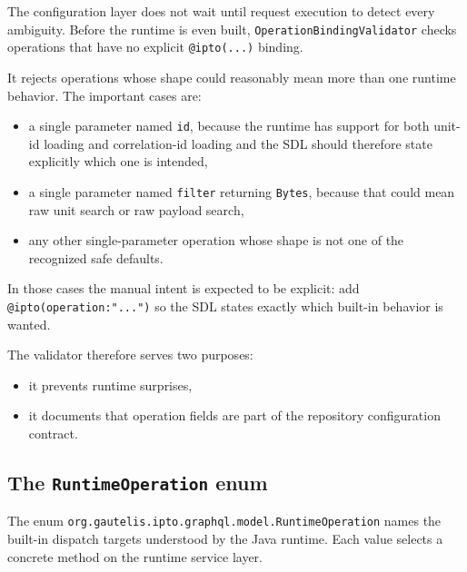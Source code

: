 The configuration layer does not wait until request execution to detect every ambiguity. Before the runtime is even built, \texttt{OperationBindingValidator} checks operations that have no explicit \texttt{@ipto(...)} binding.

It rejects operations whose shape could reasonably mean more than one runtime behavior. The important cases are:
\begin{itemize}
\item a single parameter named \texttt{id}, because the runtime has support for both unit-id loading and correlation-id loading and the SDL should therefore state explicitly which one is intended,
\item a single parameter named \texttt{filter} returning \texttt{Bytes}, because that could mean raw unit search or raw payload search,
\item any other single-parameter operation whose shape is not one of the recognized safe defaults.
\end{itemize}

In those cases the manual intent is expected to be explicit: add \texttt{@ipto(operation:"...")} so the SDL states exactly which built-in behavior is wanted.

The validator therefore serves two purposes:
\begin{itemize}
\item it prevents runtime surprises,
\item it documents that operation fields are part of the repository configuration contract.
\end{itemize}

\subsection{The \texttt{RuntimeOperation} enum}

The enum \texttt{org.gautelis.ipto.graphql.model.RuntimeOperation} names the built-in dispatch targets understood by the Java runtime. Each value selects a concrete method on the runtime service layer.

